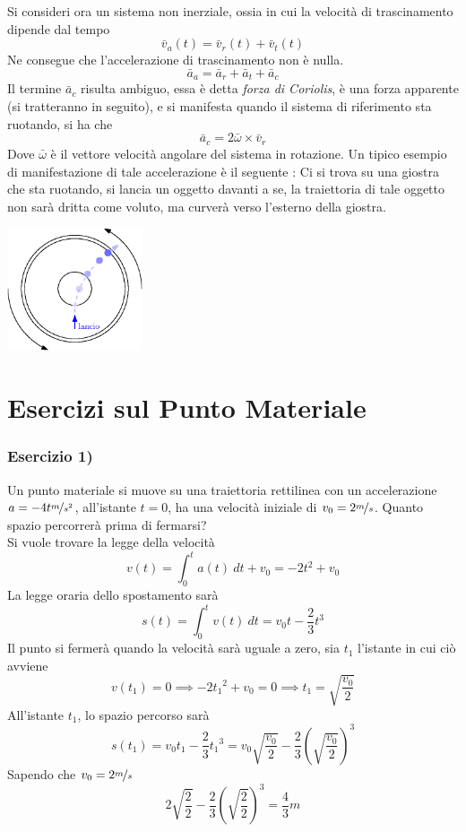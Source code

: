 \documentclass[10pt, letterpaper]{report}
\begin{document}
Si consideri ora un sistema non inerziale, ossia in cui la velocità di trascinamento dipende dal tempo 
$$\bar v_a(t) = \bar v_r(t) + \bar v_t(t) $$
Ne consegue che l'accelerazione di trascinamento non è nulla. 
$$\bar a_a = \bar a_r + \bar a_t + \bar a_c $$
Il termine $\bar a_c$ risulta ambiguo, essa è detta \textit{forza di Coriolis}, è una 
forza apparente (si tratteranno in seguito), e si manifesta 
quando il sistema di riferimento sta ruotando, si ha che 
$$\bar a_c = 2\bar \omega \times \bar v_r $$
Dove $\bar \omega$ è il vettore velocità angolare del sistema in rotazione. Un tipico esempio di 
manifestazione di tale accelerazione è il seguente : Ci si trova su una giostra che sta ruotando, 
si lancia un oggetto davanti a se, la traiettoria di tale oggetto non sarà dritta come 
voluto, ma curverà verso l'esterno della giostra.\begin{center}
    \includegraphics[width=0.3\textwidth]{images/Coriolis.eps}
    \end{center}
\flowerLine
\section{Esercizi sul Punto Materiale}
\subsubsection{Esercizio 1)}
Un punto materiale si muove su una traiettoria rettilinea con un accelerazione 
$a=-4t\nicefrac{m}{s^2}$, all'istante $t=0$, ha una velocità iniziale di $v_0=2\nicefrac{m}{s}$. 
Quanto spazio percorrerà prima di fermarsi?\\ 
Si vuole trovare la legge della velocità 
$$v(t)=\int_0^t a(t)  \ dt + v_0=-2t^2+v_0$$
La legge oraria dello spostamento sarà 
$$ s(t)=\int_0^t v(t) \ dt = v_0t-\frac{2}{3}t^3$$
Il punto si fermerà quando la velocità sarà uguale a zero, sia $t_1$ l'istante in cui ciò avviene 
$$ v(t_1)=0\implies -2{t_1}^2+v_0=0\implies t_1=\sqrt{\frac{v_0}{2}}$$
All'istante $t_1$, lo spazio percorso sarà 
$$ s(t_1)=v_0t_1-\frac{2}{3}{t_1}^3=
v_0\sqrt{\frac{v_0}{2}}-\frac{2}{3}{(\sqrt{\frac{v_0}{2}})}^3$$Sapendo che $v_0=2\nicefrac{m}{s}$
$$
2\sqrt{\frac{2}{2}}-\frac{2}{3}{(\sqrt{\frac{2}{2}})}^3=\frac{4}{3} m
$$
\end{document}
